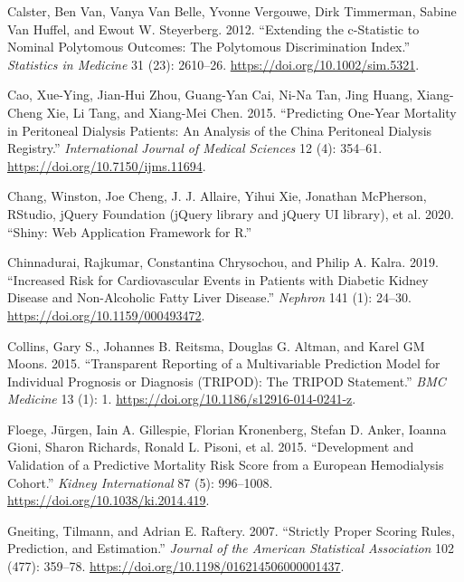 \documentclass[
]{article}
\newlength{\cslhangindent}
\newenvironment{cslreferences}%
  {\setlength{\parindent}{0pt}%
  \everypar{\setlength{\hangindent}{\cslhangindent}}\ignorespaces}%
  {\par}
\begin{document}
\begin{cslreferences}
\leavevmode\hypertarget{ref-calster_extending_2012-1}{}%
Calster, Ben Van, Vanya Van Belle, Yvonne Vergouwe, Dirk Timmerman, Sabine Van Huffel, and Ewout W. Steyerberg. 2012. ``Extending the c-Statistic to Nominal Polytomous Outcomes: The Polytomous Discrimination Index.'' \emph{Statistics in Medicine} 31 (23): 2610--26. \url{https://doi.org/10.1002/sim.5321}.

\leavevmode\hypertarget{ref-cao_predicting_2015}{}%
Cao, Xue-Ying, Jian-Hui Zhou, Guang-Yan Cai, Ni-Na Tan, Jing Huang, Xiang-Cheng Xie, Li Tang, and Xiang-Mei Chen. 2015. ``Predicting One-Year Mortality in Peritoneal Dialysis Patients: An Analysis of the China Peritoneal Dialysis Registry.'' \emph{International Journal of Medical Sciences} 12 (4): 354--61. \url{https://doi.org/10.7150/ijms.11694}.

\leavevmode\hypertarget{ref-chang_shiny_2020}{}%
Chang, Winston, Joe Cheng, J. J. Allaire, Yihui Xie, Jonathan McPherson, RStudio, jQuery Foundation (jQuery library and jQuery UI library), et al. 2020. ``Shiny: Web Application Framework for R.''

\leavevmode\hypertarget{ref-chinnadurai_increased_2019-1}{}%
Chinnadurai, Rajkumar, Constantina Chrysochou, and Philip A. Kalra. 2019. ``Increased Risk for Cardiovascular Events in Patients with Diabetic Kidney Disease and Non-Alcoholic Fatty Liver Disease.'' \emph{Nephron} 141 (1): 24--30. \url{https://doi.org/10.1159/000493472}.

\leavevmode\hypertarget{ref-collins_transparent_2015}{}%
Collins, Gary S., Johannes B. Reitsma, Douglas G. Altman, and Karel GM Moons. 2015. ``Transparent Reporting of a Multivariable Prediction Model for Individual Prognosis or Diagnosis (TRIPOD): The TRIPOD Statement.'' \emph{BMC Medicine} 13 (1): 1. \url{https://doi.org/10.1186/s12916-014-0241-z}.

\leavevmode\hypertarget{ref-floege_development_2015}{}%
Floege, Jürgen, Iain A. Gillespie, Florian Kronenberg, Stefan D. Anker, Ioanna Gioni, Sharon Richards, Ronald L. Pisoni, et al. 2015. ``Development and Validation of a Predictive Mortality Risk Score from a European Hemodialysis Cohort.'' \emph{Kidney International} 87 (5): 996--1008. \url{https://doi.org/10.1038/ki.2014.419}.

\leavevmode\hypertarget{ref-gneiting_strictly_2007}{}%
Gneiting, Tilmann, and Adrian E. Raftery. 2007. ``Strictly Proper Scoring Rules, Prediction, and Estimation.'' \emph{Journal of the American Statistical Association} 102 (477): 359--78. \url{https://doi.org/10.1198/016214506000001437}.


\end{cslreferences}
\end{document}
